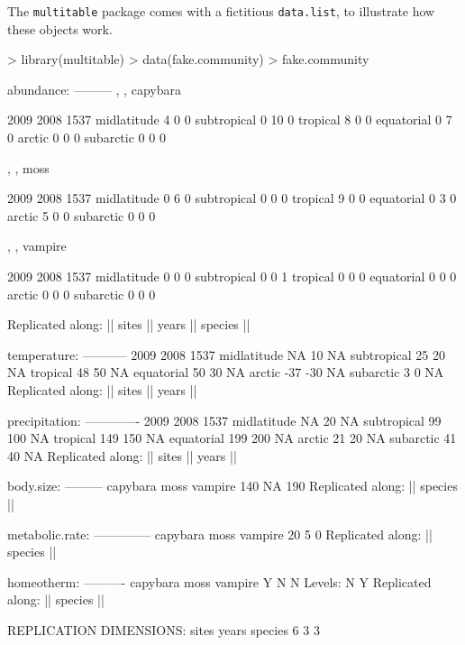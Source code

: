 \documentclass{article}
\newcommand{\code}[1]{\texttt{#1}}
\numberwithin{exercise}{section}
\begin{document}
The \code{multitable} package comes with a fictitious \code{data.list}, to illustrate how these objects work.
\begin{Schunk}
\begin{Sinput}
> library(multitable)
> data(fake.community)
> fake.community
\end{Sinput}
\begin{Soutput}
abundance:
---------
, , capybara

            2009 2008 1537
midlatitude    4    0    0
subtropical    0   10    0
tropical       8    0    0
equatorial     0    7    0
arctic         0    0    0
subarctic      0    0    0

, , moss

            2009 2008 1537
midlatitude    0    6    0
subtropical    0    0    0
tropical       9    0    0
equatorial     0    3    0
arctic         5    0    0
subarctic      0    0    0

, , vampire

            2009 2008 1537
midlatitude    0    0    0
subtropical    0    0    1
tropical       0    0    0
equatorial     0    0    0
arctic         0    0    0
subarctic      0    0    0

Replicated along:  || sites || years || species || 


temperature:
-----------
            2009 2008 1537
midlatitude   NA   10   NA
subtropical   25   20   NA
tropical      48   50   NA
equatorial    50   30   NA
arctic       -37  -30   NA
subarctic      3    0   NA
Replicated along:  || sites || years || 


precipitation:
-------------
            2009 2008 1537
midlatitude   NA   20   NA
subtropical   99  100   NA
tropical     149  150   NA
equatorial   199  200   NA
arctic        21   20   NA
subarctic     41   40   NA
Replicated along:  || sites || years || 


body.size:
---------
capybara     moss  vampire 
     140       NA      190 
Replicated along:  || species || 


metabolic.rate:
--------------
capybara     moss  vampire 
      20        5        0 
Replicated along:  || species || 


homeotherm:
----------
capybara     moss  vampire 
       Y        N        N 
Levels: N Y
Replicated along:  || species || 


REPLICATION DIMENSIONS: 
  sites   years species 
      6       3       3 
\end{Soutput}
\end{Schunk}
\end{document}
